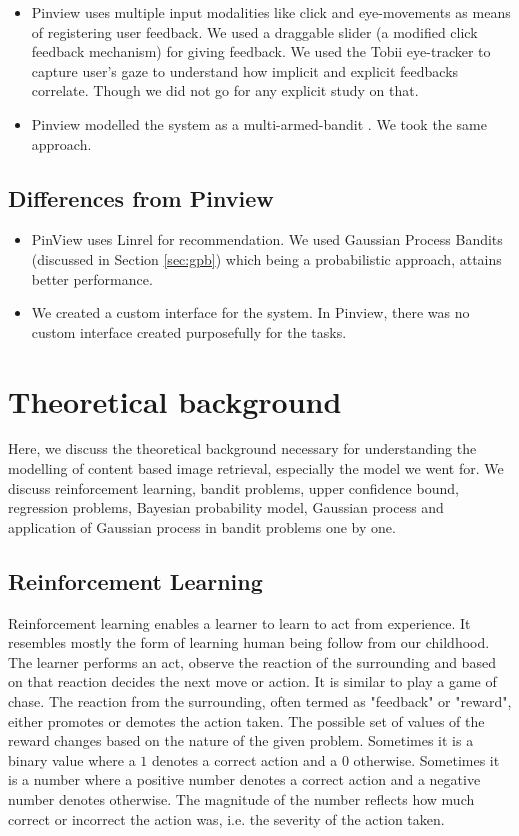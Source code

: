 \documentclass[english]{tktltiki}
\begin{document}
\begin{itemize}
	\item Pinview uses multiple input modalities like click and eye-movements as means of registering user feedback. We used a draggable slider (a modified click feedback mechanism) for giving feedback. We used the Tobii eye-tracker to capture user's gaze to understand how implicit and explicit feedbacks correlate. Though we did not go for any explicit study on that.
	\item Pinview modelled the system as a multi-armed-bandit \cite{bandits}. We took the same approach.
\end{itemize}

\subsection{Differences from Pinview}

\begin{itemize}
	\item PinView uses Linrel for recommendation. We used Gaussian Process Bandits (discussed in Section \ref{sec:gpb}) which being a probabilistic approach, attains better performance.
	\item We created a custom interface for the system. In Pinview, there was no custom interface created purposefully for the tasks.
\end{itemize}

\section{Theoretical background}

Here, we discuss the theoretical background necessary for understanding the modelling of content based image retrieval, especially the model we went for. We discuss reinforcement learning, bandit problems, upper confidence bound, regression problems, Bayesian probability model, Gaussian process and application of Gaussian process in bandit problems one by one.


\subsection{Reinforcement Learning}

Reinforcement learning \cite{reinforcement_learning} enables a learner to learn to act from experience. It resembles mostly the form of learning human being follow from our childhood. The learner performs an act, observe the reaction of the surrounding and based on that reaction decides the next move or action. It is similar to play a game of chase. The reaction from the surrounding, often termed as "feedback" or "reward", either promotes or demotes the action taken. The possible set of values of the reward changes based on the nature of the given problem. Sometimes it is a binary value where a $1$ denotes a correct action and a $0$ otherwise. Sometimes it is a number where a positive number denotes a correct action and a negative number denotes otherwise. The magnitude of the number reflects how much correct or incorrect the action was, i.e. the severity of the action taken.
\end{document}
